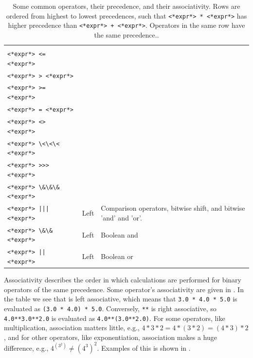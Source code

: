 \documentclass[fsharpNotes.tex]{subfiles}
\begin{document}
\begin{table}
\begin{tabularx}{\linewidth}{|l|l|X|}
    \begin{minipage}[t]{\the\myl}\lstinline[language=syntax]|<*expr*> < <*expr*>|\\\lstinline[language=syntax]|<*expr*> <= <*expr*>|\\\lstinline[language=syntax]|<*expr*> > <*expr*>|\\\lstinline[language=syntax]|<*expr*> >= <*expr*>|\\\lstinline[language=syntax]|<*expr*> = <*expr*>|\\\lstinline[language=syntax]|<*expr*> <> <*expr*>|\\\lstinline[language=syntax]|<*expr*> \<\<\< <*expr*>|\\\lstinline[language=syntax]|<*expr*> >>> <*expr*>|\\\lstinline[language=syntax]|<*expr*> \&\&\& <*expr*>|\\\lstinline[language=syntax]!<*expr*> ||| <*expr*>!\end{minipage}
             & Left & Comparison operators, bitwise shift, and bitwise 'and' and 'or'.\\
    \hline
    \begin{minipage}[t]{\the\myl}\lstinline[language=syntax]|<*expr*> \&\& <*expr*>|\end{minipage} & Left & Boolean and\\
    \hline
    \begin{minipage}[t]{\the\myl}\lstinline[language=syntax]+<*expr*> || <*expr*>+\end{minipage} & Left & Boolean or\\
    \hline
  \end{tabularx}
  \caption{Some common operators, their precedence, and their associativity. Rows are ordered from highest to lowest precedences, such that \lstinline|<*expr*> * <*expr*>| has higher precedence than \lstinline|<*expr*> + <*expr*>|. Operators in the same row have the same precedence..}
  \label{tab:someOperatorPrecedences}
\end{table}

Associativity describes the order in which calculations are performed for binary operators of the same precedence. Some operator's associativity are given in . In the table we see that \lexeme{*} is left associative, which means that \lstinline{3.0 * 4.0 * 5.0} is evaluated as \lstinline{(3.0 * 4.0) * 5.0}. Conversely, \lstinline{**} is right associative, so \lstinline{4.0**3.0**2.0} is evaluated as \lstinline{4.0**(3.0**2.0)}. For some operators, like multiplication, association matters little, e.g., $4*3*2=4*(3*2)=(4*3)*2$, and for other operators, like exponentiation, association makes a huge difference, e.g., $4^{(3^2)}\neq (4^3)^2$. Examples of this is shown in .
%
%
%
\end{document}
